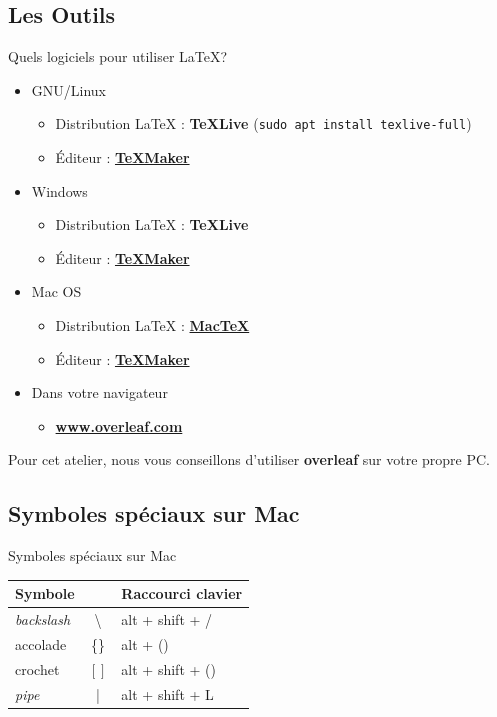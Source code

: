 \documentclass[10pt,svgnames,usenames,table]{beamer} %
\begin{document}
\subsection{Les Outils}
\begin{frame}{Quels logiciels pour utiliser \LaTeX{}?}

  \begin{itemize}
      \item GNU/Linux
      \begin{itemize}
          \item Distribution \LaTeX{} : \textbf{TeXLive}
          {\tiny (\lstinline|sudo apt install texlive-full|)}
        \item Éditeur : \textbf{\href{http://www.xm1math.net/texmaker/}{TeXMaker}}
      \end{itemize}
      \item Windows
      \begin{itemize}
        \item Distribution \LaTeX{} : \textbf{TeXLive}
        \item Éditeur : \textbf{\href{http://www.xm1math.net/texmaker/}{TeXMaker}}
      \end{itemize}
      \item Mac OS
      \begin{itemize}
        \item Distribution \LaTeX{} : \textbf{\href{https://www.tug.org/mactex/}{MacTeX}}
        \item Éditeur : \textbf{\href{http://www.xm1math.net/texmaker/}{TeXMaker}}
      \end{itemize}
      \item Dans votre navigateur
      \begin{itemize}
        \item \textbf{\url{www.overleaf.com}}
      \end{itemize}
  \end{itemize}
  Pour cet atelier, nous vous conseillons d'utiliser \textbf{overleaf} sur votre propre PC. 
\end{frame}

\subsection{Symboles spéciaux sur Mac}
\begin{frame}{Symboles spéciaux sur Mac}
  \begin{center}
    \begin{tabular}{|lc|l|}
      \hline
      Symbole & & Raccourci clavier \\\hline
      \textit{backslash} & \textbackslash & alt + shift + / \\
      accolade & \{\} & alt + () \\
      crochet & $[]$ & alt + shift + () \\
      \textit{pipe} & | & alt + shift + L \\
      \hline
    \end{tabular}
  \end{center}
\end{frame}
\end{document}
